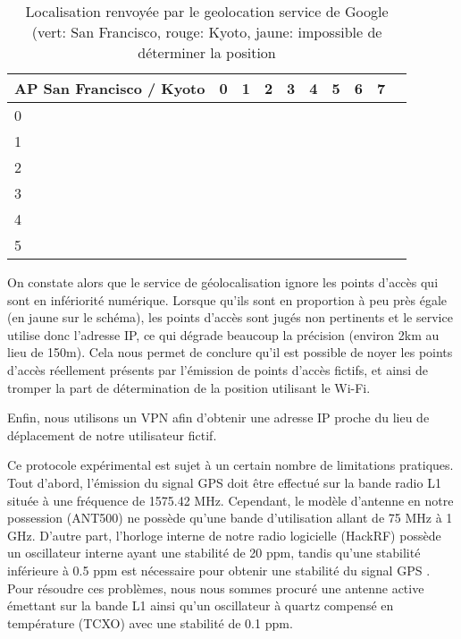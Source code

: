 \documentclass[runningheads]{llncs}
\begin{document}
\newcommand{\green}{\cellcolor{green!50}}
\newcommand{\red}{\cellcolor{red!50}}
\newcommand{\yellow}{\cellcolor{yellow!80}}
\begin{table}
\centering
\begin{tabular} {| m{4.5cm} | m{0.6cm}| m{0.6cm} | m{0.6cm} | m{0.6cm} | m{0.6cm} | m{0.6cm} | m{0.6cm} | m{0.6cm} | m{0.6cm} |}
 \hline
 AP San Francisco / Kyoto & 0 & 1 & 2 & 3 & 4 & 5 & 6 & 7   \\
 \hline
 0  & \cellcolor{black} & \red & \red & \red & \red & \red & \red & \red     \\
 \hline
 1 & \green & \yellow & \yellow & \red & \red & \red & \red & \red  \\
 \hline
 2 & \green & \green & \green & \yellow & \red & \red & \red & \red  \\
 \hline
 3 & \green & \green & \green & \green & \yellow & \red & \red & \red  \\
 \hline
 4 & \green & \green & \green & \green & \green & \yellow & \yellow & \red  \\
 \hline
 5 & \green & \green & \green & \green & \green & \green & \green & \yellow  \\
 \hline
\end{tabular} 
\vspace{10pt}
\setlength{\belowcaptionskip}{-10pt}
\caption{\label{tab:table-name} Localisation renvoyée par le geolocation service de Google (vert: San Francisco, rouge: Kyoto, jaune: impossible de déterminer la position}
\end{table}

On constate alors que le service de géolocalisation ignore les points d'accès qui sont en infériorité numérique. Lorsque qu'ils sont en proportion à peu près égale (en jaune sur le schéma), les points d'accès sont jugés non pertinents et le service utilise donc l'adresse IP, ce qui dégrade beaucoup la précision (environ 2km au lieu de 150m). Cela nous permet de conclure qu'il est possible de noyer les points d'accès réellement présents par l'émission de points d'accès fictifs, et ainsi de tromper la part de détermination de la position utilisant le Wi-Fi. 

Enfin, nous utilisons un VPN afin d'obtenir une adresse IP proche du lieu de déplacement de notre utilisateur fictif.

Ce protocole expérimental est sujet à un certain nombre de limitations pratiques. 
Tout d'abord, l'émission du signal GPS doit être effectué sur la bande radio L1 située à une fréquence de 1575.42 MHz. Cependant, le modèle d'antenne en notre possession (ANT500) ne possède qu'une bande d'utilisation allant de 75 MHz à 1 GHz. D'autre part, l'horloge interne de notre radio logicielle (HackRF) possède un oscillateur interne ayant une stabilité de 20 ppm, tandis qu'une stabilité inférieure à 0.5 ppm est nécessaire pour obtenir une stabilité du signal GPS \cite{kao_miniature_2014}. Pour résoudre ces problèmes, nous nous sommes procuré une antenne active émettant sur la bande L1 ainsi qu'un oscillateur à quartz compensé en température (TCXO) avec une stabilité de 0.1 ppm. 
\end{document}

